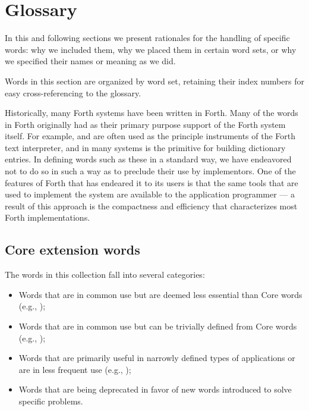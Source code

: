 \section{Glossary} %

In this and following sections we present rationales for the handling
of specific words: why we included them, why we placed them in certain
word sets, or why we specified their names or meaning as we did.

Words in this section are organized by word set, retaining their index
numbers for easy cross-referencing to the glossary.

Historically, many Forth systems have been written in Forth. Many of
the words in Forth originally had as their primary purpose support of
the Forth system itself. For example,  and  are
often used as the principle instruments of the Forth text interpreter,
and  in many systems is the primitive for building
dictionary entries. In defining words such as these in a standard way,
we have endeavored not to do so in such a way as to preclude their use
by implementors. One of the features of Forth that has endeared it to
its users is that the same tools that are used to implement the system
are available to the application programmer --- a result of this
approach is the compactness and efficiency that characterizes most
Forth implementations.


\setcounter{subsection}{1}
\subsection{Core extension words} %
\label{rat:core-ext}

The words in this collection fall into several categories:

\begin{itemize}
\item Words that are in common use but are deemed less essential than
	Core words (e.g., );

\item Words that are in common use but can be trivially defined from
	Core words (e.g., );

\item Words that are primarily useful in narrowly defined types of
	applications or are in less frequent use (e.g., );

\item Words that are being deprecated in favor of new words introduced
	to solve specific problems.
\end{itemize}

